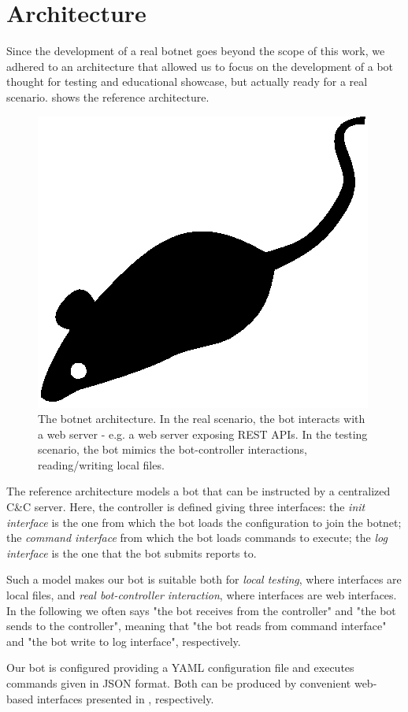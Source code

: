 \section{Architecture}
\label{sec:architecture}

Since the development of a real botnet goes beyond the scope of this work, we adhered to an architecture that allowed us to focus on the development of a bot thought for testing and educational showcase, but actually ready for a real scenario.  shows the reference architecture.

\begin{figure}[tp]
  \centering
  \includegraphics{./fig/acmlarge-mouse}
  \caption{The botnet architecture. In the real scenario, the bot interacts with a web server - e.g. a web server exposing REST APIs. In the testing scenario, the bot mimics the bot-controller interactions, reading/writing local files.}
    \label{fig:botnet-architecture}
\end{figure}

The reference architecture models a bot that can be instructed by a centralized C\&C server.
Here, the controller is defined giving three interfaces: the \textit{init interface} is the one from which the bot loads the configuration to join the botnet; the \textit{command interface} from which the bot loads commands to execute; the \textit{log interface} is the one that the bot submits reports to.

Such a model makes our bot is suitable both for \textit{local testing}, where interfaces are local files, and \textit{real bot-controller interaction}, where interfaces are web interfaces. In the following we often says "the bot receives from the controller" and "the bot sends to the controller", meaning that "the bot reads from command interface" and "the bot write to log interface", respectively.

Our bot is configured providing a YAML configuration file and executes commands given in JSON format. Both can be produced by convenient web-based interfaces presented in  , respectively.
